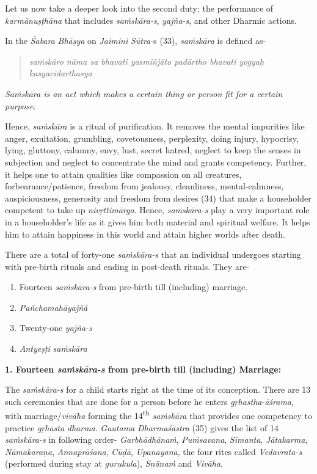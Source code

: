 Let us now take a deeper look into the second duty: the performance of \emph{karmānuṣṭhāna} that includes \emph{saṁskāra-s}, \emph{yajña-s}, and other Dharmic actions.

In the \emph{Śabara} \emph{Bhāṣya} on \emph{Jaimini} \emph{Sūtra-}s (33), \emph{saṁskāra} is defined as-

\begin{verse}
\emph{saṁskāro nāma sa bhavati yasmiñjāto padārtho bhavati yogyaḥ kasyacidarthasya }
\end{verse}

\emph{Saṁskāra is an act which makes a certain thing or person fit for a certain purpose.}

Hence, \emph{saṁskāra} is a ritual of purification. It removes the mental impurities like anger, exultation, grumbling, covetousness, perplexity, doing injury, hypocrisy, lying, gluttony, calumny, envy, lust, secret hatred, neglect to keep the senses in subjection and neglect to concentrate the mind and grants competency. Further, it helps one to attain qualities like compassion on all creatures, forbearance/patience, freedom from jealousy, cleanliness, mental-calmness, auspiciousness, generosity and freedom from desires (34) that make a householder competent to take up \emph{nivṛttimārga}. Hence, \emph{saṁskāra-s} play a very important role in a householder's life as it gives him both material and spiritual welfare. It helps him to attain happiness in this world and attain higher worlds after death.

There are a total of forty-one \emph{saṁskāra-s} that an individual undergoes starting with pre-birth rituals and ending in post-death rituals. They are-

\begin{enumerate}
\itemsep=0pt
\item
  Fourteen \emph{saṁskāra-s} from pre-birth till (including) marriage.
\item
  \emph{Pañchamahāyajñá}
\item
  Twenty-one \emph{yajña-s}
\item
  \emph{Antyeṣṭi} \emph{saṁskāra}
\end{enumerate}

\textbf{1. Fourteen \emph{saṁskāra-s} from pre-birth till (including) Marriage:}

The \emph{saṁskāra-s} for a child starts right at the time of its conception. There are 13 such ceremonies that are done for a person before he enters \emph{gṛhastha}-\emph{āśrama}, with marriage/\emph{vivāha} forming the 14\textsuperscript{th} \emph{saṁskāra} that provides one competency to practice \emph{gṛhasta} \emph{dharma}. \emph{Gautama} \emph{Dharmaśāstra} (35) gives the list of 14 \emph{saṁskāra-s} in following order- \emph{Garbhādhānaṁ}, \emph{Puṁsavana}, \emph{Sīmanta}, \emph{Jātakarma}, \emph{Nāmakaraṇa}, \emph{Annaprāśana}, \emph{Cūḍā}, \emph{Upanayana}, the four rites called \emph{Vedavrata-s} (performed during stay at \emph{gurukula}), \emph{Snānaṁ} and \emph{Vivāha}.

